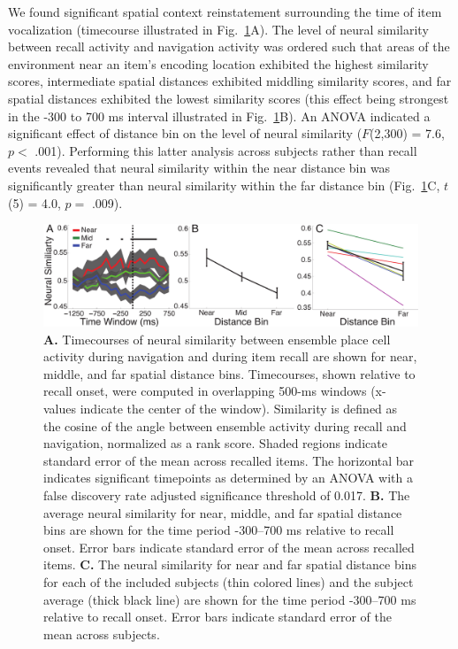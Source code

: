 We found significant spatial context reinstatement surrounding the time of item vocalization (timecourse illustrated in Fig.~\ref{fig:reinstate}A). The level of neural similarity between recall activity and navigation activity was ordered such that areas of the environment near  an item's encoding location exhibited the highest similarity scores, intermediate spatial distances exhibited middling similarity scores, and far spatial distances exhibited the lowest similarity scores (this effect being strongest in the -300 to 700 ms interval illustrated in Fig.~\ref{fig:reinstate}B).  An ANOVA indicated a significant effect of distance bin on the level of neural similarity ($F$(2,300) = 7.6, $p <$ .001). Performing this latter analysis across subjects rather than recall events revealed that neural similarity within the near distance bin was significantly greater than neural similarity within the far distance bin (Fig.~\ref{fig:reinstate}C, $t$(5) = 4.0, $p =$ .009).   

\begin{figure}
\centering
  \includegraphics[width=1\textwidth]{./tex/dboy/figs/fig3}
  \caption[Timecourse of neural similarity]{\textbf{A.} Timecourses of neural similarity between ensemble place cell activity during navigation and during item recall are shown for near, middle, and far spatial distance bins.  Timecourses, shown relative to recall onset, were  computed in overlapping 500-ms windows (x-values indicate the center of the window).  Similarity is defined as the cosine of the angle between ensemble activity during recall and navigation, normalized as a rank score. Shaded regions indicate standard error of the mean across recalled items. The horizontal bar indicates significant timepoints as determined by an ANOVA with a false discovery rate adjusted significance threshold of 0.017.  \textbf{B.} The average neural similarity for near, middle, and far spatial distance bins are shown for the time period -300--700 ms relative to recall onset. Error bars indicate standard error of the mean across recalled items.  \textbf{C.} The neural similarity for near and far spatial distance bins for each of the included subjects (thin colored lines) and the subject average (thick black line) are shown for the  time period -300--700 ms relative to recall onset. Error bars indicate standard error of the mean across subjects.}
\label{fig:reinstate}
\end{figure}

